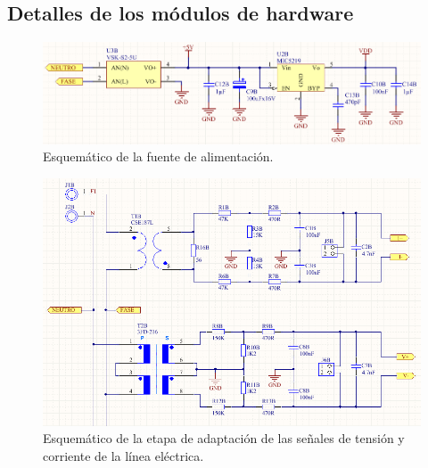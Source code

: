 \subsection{Detalles de los módulos de hardware}

\begin{figure}[h]
	\centering
	\includegraphics[width=14cm]{./Figures/3_1_2_pcb_fuente.png}
	\caption{Esquemático de la fuente de alimentación.}
	\label{fig:pcb_fuente}
\end{figure}

\begin{figure}[h]
	\centering
	\includegraphics[width=14cm]{./Figures/3_1_2_pcb_adaptacion.png}
	\caption{Esquemático de la etapa de adaptación de las señales de tensión y corriente de la línea eléctrica.}
	\label{fig:pcb_adaptacion}
\end{figure}

